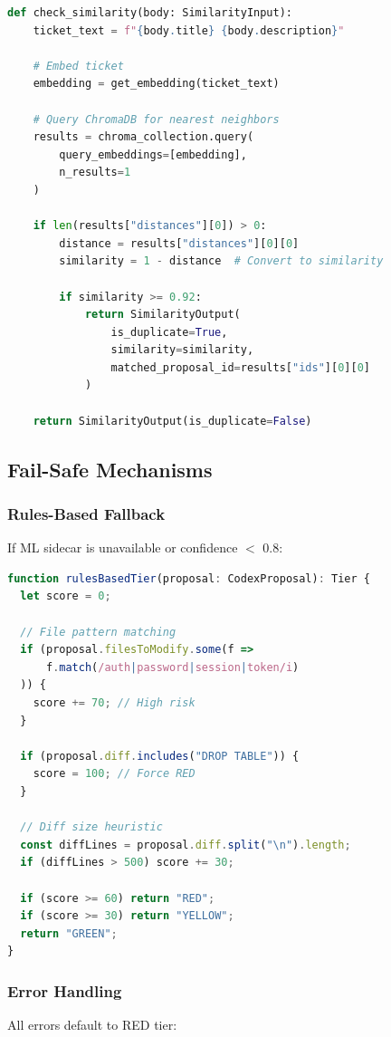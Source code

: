 \documentclass[11pt,a4paper]{article}
\begin{document}
\begin{lstlisting}[language=Python,caption=Similarity Check (similarity.py)]
def check_similarity(body: SimilarityInput):
    ticket_text = f"{body.title} {body.description}"
    
    # Embed ticket
    embedding = get_embedding(ticket_text)
    
    # Query ChromaDB for nearest neighbors
    results = chroma_collection.query(
        query_embeddings=[embedding],
        n_results=1
    )
    
    if len(results["distances"][0]) > 0:
        distance = results["distances"][0][0]
        similarity = 1 - distance  # Convert to similarity
        
        if similarity >= 0.92:
            return SimilarityOutput(
                is_duplicate=True,
                similarity=similarity,
                matched_proposal_id=results["ids"][0][0]
            )
    
    return SimilarityOutput(is_duplicate=False)
\end{lstlisting}

\newpage
\subsection{Fail-Safe Mechanisms}

\subsubsection{Rules-Based Fallback}
If ML sidecar is unavailable or confidence $<$ 0.8:

\begin{lstlisting}[language=JavaScript,caption=Rules-Based Scorer (riskEngine.ts)]
function rulesBasedTier(proposal: CodexProposal): Tier {
  let score = 0;
  
  // File pattern matching
  if (proposal.filesToModify.some(f => 
      f.match(/auth|password|session|token/i)
  )) {
    score += 70; // High risk
  }
  
  if (proposal.diff.includes("DROP TABLE")) {
    score = 100; // Force RED
  }
  
  // Diff size heuristic
  const diffLines = proposal.diff.split("\n").length;
  if (diffLines > 500) score += 30;
  
  if (score >= 60) return "RED";
  if (score >= 30) return "YELLOW";
  return "GREEN";
}
\end{lstlisting}

\subsubsection{Error Handling}
All errors default to RED tier:
\end{document}
